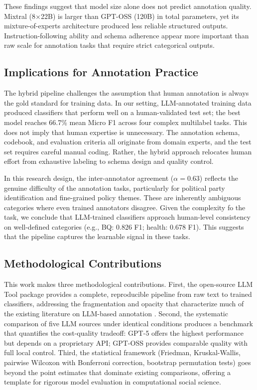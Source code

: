 \documentclass[12pt]{article}
\begin{document}
These findings suggest that model size alone does not predict annotation quality. Mixtral (8$\times$22B) is larger than GPT-OSS (120B) in total parameters, yet its mixture-of-experts architecture produced less reliable structured outputs. Instruction-following ability and schema adherence appear more important than raw scale for annotation tasks that require strict categorical outputs.

\subsection{Implications for Annotation Practice}

The hybrid pipeline challenges the assumption that human annotation is always the gold standard for training data. In our setting, LLM-annotated training data produced classifiers that perform well on a human-validated test set; the best model reaches 66.7\% mean Micro F1 across four complex multilabel tasks. This does not imply that human expertise is unnecessary. The annotation schema, codebook, and evaluation criteria all originate from domain experts, and the test set requires careful manual coding. Rather, the hybrid approach relocates human effort from exhaustive labeling to schema design and quality control.

In this research design, the inter-annotator agreement ($\alpha = 0.63$) reflects the genuine difficulty of the annotation tasks, particularly for political party identification and fine-grained policy themes. These are inherently ambiguous categories where even trained annotators disagree. Given the complexity fo the task, we conclude that LLM-trained classifiers approach human-level consistency on well-defined categories (e.g., BQ: 0.826 F1; health: 0.678 F1). This suggests that the pipeline captures the learnable signal in these tasks.

\subsection{Methodological Contributions}

This work makes three methodological contributions. First, the open-source LLM Tool package provides a complete, reproducible pipeline from raw text to trained classifiers, addressing the fragmentation and opacity that characterize much of the existing literature on LLM-based annotation \parencite{weber_reichardt23}. Second, the systematic comparison of five LLM sources under identical conditions produces a benchmark that quantifies the cost-quality tradeoff: GPT-5 offers the highest performance but depends on a proprietary API; GPT-OSS provides comparable quality with full local control. Third, the statistical framework (Friedman, Kruskal-Wallis, pairwise Wilcoxon with Bonferroni correction, bootstrap permutation tests) goes beyond the point estimates that dominate existing comparisons, offering a template for rigorous model evaluation in computational social science.
\end{document}
